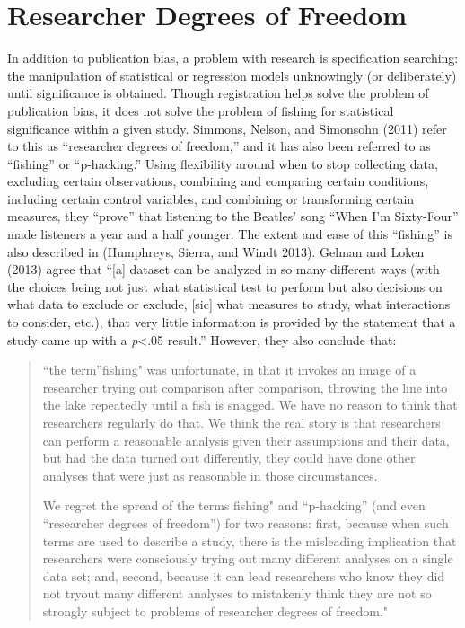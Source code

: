 \documentclass[12pt] {article}
\begin{document}
\section{Researcher Degrees of
Freedom}\label{researcher-degrees-of-freedom}

In addition to publication bias, a problem with research is
specification searching: the manipulation of statistical or regression
models unknowingly (or deliberately) until significance is obtained.
Though registration helps solve the problem of publication bias, it does
not solve the problem of fishing for statistical significance within a
given study. Simmons, Nelson, and Simonsohn (2011) refer to this as
``researcher degrees of freedom,'' and it has also been referred to as
``fishing'' or ``p-hacking.'' Using flexibility around when to stop
collecting data, excluding certain observations, combining and comparing
certain conditions, including certain control variables, and combining
or transforming certain measures, they ``prove'' that listening to the
Beatles' song ``When I'm Sixty-Four'' made listeners a year and a half
younger. The extent and ease of this ``fishing'' is also described in
(Humphreys, Sierra, and Windt 2013). Gelman and Loken (2013) agree that
``{[}a{]} dataset can be analyzed in so many different ways (with the
choices being not just what statistical test to perform but also
decisions on what data to exclude or exclude, {[}sic{]} what measures to
study, what interactions to consider, etc.), that very little
information is provided by the statement that a study came up with a
\emph{p}\textless{}.05 result.'' However, they also conclude that:

\begin{quote}
``the term''fishing" was unfortunate, in that it invokes an image of a
researcher trying out comparison after comparison, throwing the line
into the lake repeatedly until a fish is snagged. We have no reason to
think that researchers regularly do that. We think the real story is
that researchers can perform a reasonable analysis given their
assumptions and their data, but had the data turned out differently,
they could have done other analyses that were just as reasonable in
those circumstances.

We regret the spread of the terms fishing" and ``p-hacking'' (and even
``researcher degrees of freedom'') for two reasons: first, because when
such terms are used to describe a study, there is the misleading
implication that researchers were consciously trying out many different
analyses on a single data set; and, second, because it can lead
researchers who know they did not tryout many different analyses to
mistakenly think they are not so strongly subject to problems of
researcher degrees of freedom."
\end{quote}
\end{document}
